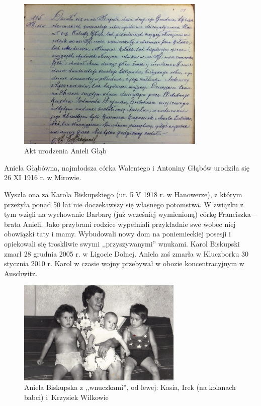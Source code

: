 \begin{figure}[!h]
\begin{center}
\includegraphics[width=0.8\textwidth]{zdjecia/akt_urodzenia_anieli_glab.jpg}
\caption{Akt urodzenia Anieli Głąb}
\label{rys:akt_urodzenia_anieli_glab}
\end{center}
\end{figure}

Aniela Głąbówna, najmłodsza córka Walentego i Antoniny Głąbów urodziła się 26 XI 1916 r. w Mirowie.

Wyszła ona za Karola Biskupskiego (ur. 5 V 1918 r. w Hanowerze), z którym przeżyła ponad 50 lat nie doczekawszy się własnego potomstwa. W związku z tym wzięli na wychowanie Barbarę (już wcześniej wymienioną) córkę Franciszka -- brata Anieli. Jako przybrani rodzice wypełniali przykładnie swe wobec niej obowiązki taty i mamy. Wybudowali nowy dom na poniemieckiej posesji i opiekowali się troskliwie swymi ,,przyszywanymi'' wnukami. Karol Biskupski zmarł 28 grudnia 2005 r. w Ligocie Dolnej. Aniela zaś zmarła w Kluczborku 30 stycznia 2010 r. Karol w czasie wojny przebywał w obozie koncentracyjnym w Auschwitz.

\begin{figure}[!h]
\begin{center}
\includegraphics[width=0.7\textwidth]{zdjecia/aniela_biskupska_z_wnuczkami.jpg}
\caption[Aniela Biskupska z wnuczkami]{Aniela Biskupska z ,,wnuczkami'', od lewej: Kasia, Irek (na kolanach babci) i~Krzysiek Wilkowie}
\label{rys:aniela_biskupska_z_wnuczkami}
\end{center}
\end{figure}


